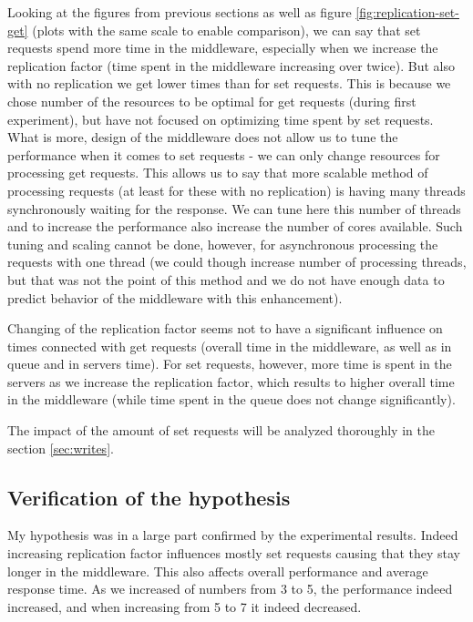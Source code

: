 \documentclass[11pt]{article}
\begin{document}

Looking at the figures from previous sections as well as figure \ref{fig:replication-set-get} (plots with the same scale to enable comparison), we can say that set requests spend more time in the middleware, especially when we increase the replication factor (time spent in the middleware increasing over twice). But also with no replication we get lower times than for set requests. This is because we chose number of the resources to be optimal for get requests (during first experiment), but have not focused on optimizing time spent by set requests. What is more, design of the middleware does not allow us to tune the performance when it comes to set requests - we can only change resources for processing get requests. This allows us to say that more scalable method of processing requests (at least for these with no replication) is having many threads synchronously waiting for the response. We can tune here this number of threads and to increase the performance also increase the number of cores available. Such tuning and scaling cannot be done, however, for asynchronous processing the requests with one thread (we could though increase number of processing threads, but that was not the point of this method and we do not have enough data to predict behavior of the middleware with this enhancement).

Changing of the replication factor seems not to have a significant influence on times connected with get requests (overall time in the middleware, as well as in queue and in servers time). For set requests, however, more time is spent in the servers as we increase the replication factor, which results to higher overall time in the middleware (while time spent in the queue does not change significantly).

The impact of the amount of set requests will be analyzed thoroughly in the section \ref{sec:writes}.

\subsection{Verification of the hypothesis}

My hypothesis was in a large part confirmed by the experimental results. Indeed increasing replication factor influences mostly set requests causing that they stay longer in the middleware. This also affects overall performance and average response time. As we increased of numbers from 3 to 5, the performance indeed increased, and when increasing from 5 to 7 it indeed decreased.
\end{document}
